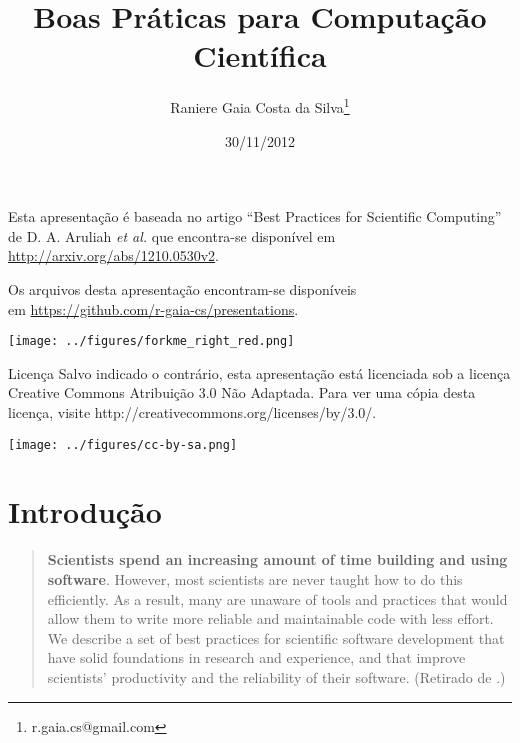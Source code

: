 \documentclass[11pt]{beamer}
\begin{document}
\title[Boas Práticas para Comp. Científica]{Boas Práticas para Computação Científica}
\author[Raniere Silva]{Raniere Gaia Costa da
Silva\footnote{r.gaia.cs@gmail.com}}
\date{30/11/2012}

\begin{frame}
    \maketitle
\end{frame}

\begin{frame}
    Esta apresentação é baseada no artigo ``Best Practices for Scientific
    Computing'' de D. A. Aruliah \textit{et al.} que encontra-se disponível em
    \url{http://arxiv.org/abs/1210.0530v2}.

    \begin{block}{}
        Os arquivos desta apresentação encontram-se disponíveis \\
        em \url{https://github.com/r-gaia-cs/presentations}. \\
        \vspace{-33pt}
        \begin{flushright}
            \texttt{[image: ../figures/forkme\_right\_red.png]}
        \end{flushright}
    \end{block}

    \begin{block}{Licença}
        Salvo indicado o contrário, esta apresentação está licenciada sob a licença
        Creative Commons Atribuição 3.0 Não Adaptada. Para ver uma cópia desta
        licença, visite http://creativecommons.org/licenses/by/3.0/.
        \begin{center}
            \texttt{[image: ../figures/cc-by-sa.png]}
        \end{center}
    \end{block}
\end{frame}

\begin{frame}
    \tableofcontents
\end{frame}

\section{Introdução}
\begin{frame}
    \begin{quotation}
        \textbf<2>{Scientists spend an increasing amount of time building and using
        software}. However, most scientists are never taught how to do this
        efficiently. As a result, many are unaware of tools and practices that
        would allow them to write more reliable and maintainable code with less
        effort. We describe a set of best practices for scientific software
        development that have solid foundations in research and experience, and
        that improve scientists’ productivity and the reliability of their
        software. (Retirado de \cite{Aruliah-2012-Best}.)
    \end{quotation}
\end{frame}
\end{document}
